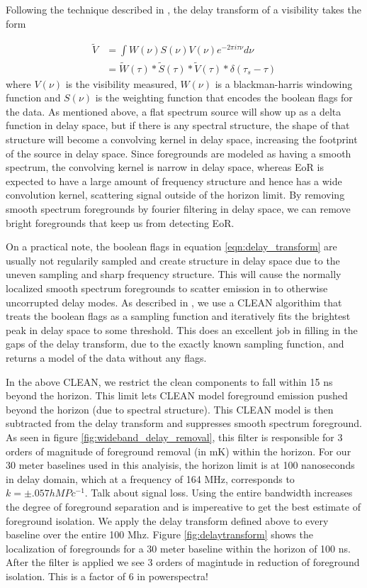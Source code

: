 \documentclass[twocolumn,numberedappendix]{emulateapj}
\begin{document}
Following the technique described in \citep{parsons_2012b}, the delay transform
of a visibility takes the form 

\begin{align}\label{eqn:delay_transform}
    \tilde{V} &= \int{W(\nu)S(\nu)V(\nu)e^{-2\pi{i}\tau\nu}d\nu} \\
              &= \tilde{W}(\tau) \ast \tilde{S}(\tau) \ast \tilde{V}(\tau) \ast
                 \delta(\tau_{s} - \tau)
\end{align}
where $V(\nu)$ is the visibility measured, $W(\nu)$ is a blackman-harris
windowing function and $S(\nu)$ is the weighting function that encodes the
boolean flags for the data. As mentioned above, a flat spectrum source will show
up as a delta function in delay space, but if there is any spectral structure,
the shape of that structure will become a convolving kernel in delay space,
increasing the footprint of the source in delay space. Since foregrounds are
modeled as having a smooth spectrum, the convolving kernel is narrow in delay
space, whereas EoR is expected to have a large amount of frequency structure
and hence has a wide convolution kernel, scattering signal outside of the
horizon limit. By removing smooth spectrum foregrounds by fourier filtering in
delay space, we can remove bright foregrounds that keep us from detecting EoR.

On a practical note, the boolean flags in equation \ref{eqn:delay_transform} are
usually not regularily sampled and create structure in delay space due to the
uneven sampling and sharp frequency structure. This will cause the normally
localized smooth spectrum foregrounds to scatter emission in to otherwise
uncorrupted delay modes. As described in \cite{parsons_backer2009}, we use a
CLEAN algorithim that treats the boolean flags as a sampling function and
iteratively fits the brightest peak in delay space to some threshold. This does
an excellent job in filling in the gaps of the delay transform, due to the
exactly known sampling function, and returns a model of the data without any
flags. 

In the above CLEAN, we restrict the clean components to fall within 15 ns beyond
the horizon. This limit lets CLEAN model foreground emission pushed beyond the
horizon (due to spectral structure). This CLEAN model is then subtracted from
the delay transform and suppresses smooth spectrum foreground. As seen in figure
\ref{fig:wideband_delay_removal}, this filter is responsible for 3 orders of
magnitude of foreground removal (in mK) within the horizon. For our 30 meter baselines
used in this analyisis, the horizon limit is at 100 nanoseconds in delay domain,
which at a frequency of 164 MHz, corresponds to $k = \pm .057 h MPc^{-1}$.
Talk about signal loss.
Using the entire bandwidth increases the degree of foreground separation and is
impereative to get the best estimate of foreground isolation. We apply the delay
transform defined above to every baseline over the entire 100 Mhz. Figure
\ref{fig:delaytransform} shows the localization of foregrounds for a 30 meter
baseline within the horizon of 100 ns. After the filter is applied we see 3
orders of magintude in reduction of foreground isolation.  This is a factor of 6
in powerspectra! 
\end{document}
